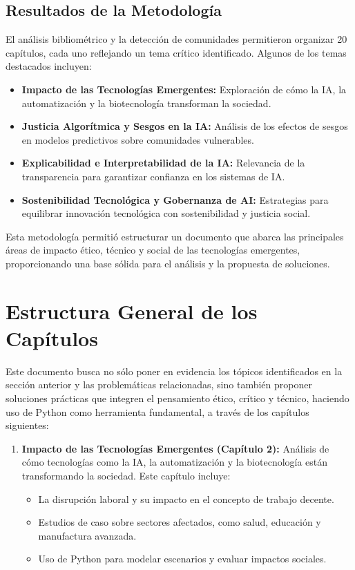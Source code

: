 \begin{refsection}
\subsection{Resultados de la Metodología}

El análisis bibliométrico y la detección de comunidades permitieron organizar 20 capítulos, cada uno reflejando un tema crítico identificado. Algunos de los temas destacados incluyen:
\begin{itemize}
    \item \textbf{Impacto de las Tecnologías Emergentes:} Exploración de cómo la IA, la automatización y la biotecnología transforman la sociedad.
    \item \textbf{Justicia Algorítmica y Sesgos en la IA:} Análisis de los efectos de sesgos en modelos predictivos sobre comunidades vulnerables.
    \item \textbf{Explicabilidad e Interpretabilidad de la IA:} Relevancia de la transparencia para garantizar confianza en los sistemas de IA.
    \item \textbf{Sostenibilidad Tecnológica y Gobernanza de AI:} Estrategias para equilibrar innovación tecnológica con sostenibilidad y justicia social.
\end{itemize}

Esta metodología permitió estructurar un documento que abarca las principales áreas de impacto ético, técnico y social de las tecnologías emergentes, proporcionando una base sólida para el análisis y la propuesta de soluciones.









\section{Estructura General de los Capítulos}



Este documento busca no sólo poner en evidencia los tópicos identificados en la sección anterior y las problemáticas relacionadas, sino también proponer soluciones prácticas que integren el pensamiento ético, crítico y técnico, haciendo uso de Python como herramienta fundamental, a través de los capítulos siguientes:


\begin{enumerate}
    \item \textbf{Impacto de las Tecnologías Emergentes (Capítulo 2):}  
    Análisis de cómo tecnologías como la IA, la automatización y la biotecnología están transformando la sociedad. Este capítulo incluye:
    \begin{itemize}
        \item La disrupción laboral y su impacto en el concepto de trabajo decente.
        \item Estudios de caso sobre sectores afectados, como salud, educación y manufactura avanzada.
        \item Uso de Python para modelar escenarios y evaluar impactos sociales.
    \end{itemize}


\end{enumerate}
\end{refsection}
